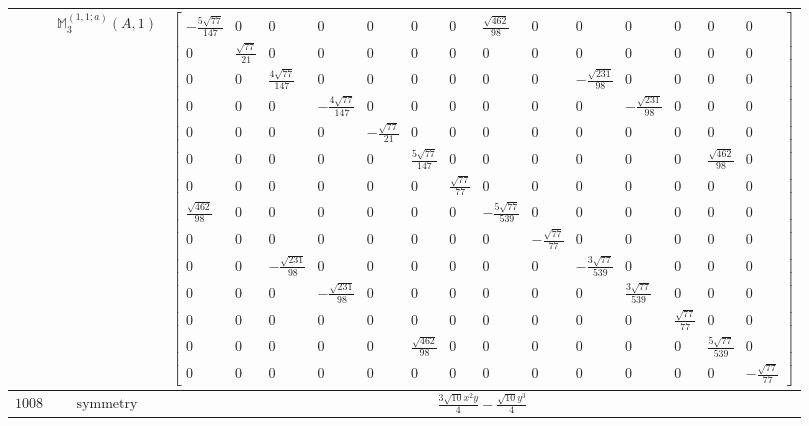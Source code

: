 \documentclass[fleqn,8pt,landscape]{jsarticle}
\begin{document}
\begin{longtable}{ccc}
$  $ & $ \mathbb{M}_{3}^{(1,1;a)}(A,1) $ & $ \begin{bmatrix} - \frac{5 \sqrt{77}}{147} & 0 & 0 & 0 & 0 & 0 & 0 & \frac{\sqrt{462}}{98} & 0 & 0 & 0 & 0 & 0 & 0 \\ 0 & \frac{\sqrt{77}}{21} & 0 & 0 & 0 & 0 & 0 & 0 & 0 & 0 & 0 & 0 & 0 & 0 \\ 0 & 0 & \frac{4 \sqrt{77}}{147} & 0 & 0 & 0 & 0 & 0 & 0 & - \frac{\sqrt{231}}{98} & 0 & 0 & 0 & 0 \\ 0 & 0 & 0 & - \frac{4 \sqrt{77}}{147} & 0 & 0 & 0 & 0 & 0 & 0 & - \frac{\sqrt{231}}{98} & 0 & 0 & 0 \\ 0 & 0 & 0 & 0 & - \frac{\sqrt{77}}{21} & 0 & 0 & 0 & 0 & 0 & 0 & 0 & 0 & 0 \\ 0 & 0 & 0 & 0 & 0 & \frac{5 \sqrt{77}}{147} & 0 & 0 & 0 & 0 & 0 & 0 & \frac{\sqrt{462}}{98} & 0 \\ 0 & 0 & 0 & 0 & 0 & 0 & \frac{\sqrt{77}}{77} & 0 & 0 & 0 & 0 & 0 & 0 & 0 \\ \frac{\sqrt{462}}{98} & 0 & 0 & 0 & 0 & 0 & 0 & - \frac{5 \sqrt{77}}{539} & 0 & 0 & 0 & 0 & 0 & 0 \\ 0 & 0 & 0 & 0 & 0 & 0 & 0 & 0 & - \frac{\sqrt{77}}{77} & 0 & 0 & 0 & 0 & 0 \\ 0 & 0 & - \frac{\sqrt{231}}{98} & 0 & 0 & 0 & 0 & 0 & 0 & - \frac{3 \sqrt{77}}{539} & 0 & 0 & 0 & 0 \\ 0 & 0 & 0 & - \frac{\sqrt{231}}{98} & 0 & 0 & 0 & 0 & 0 & 0 & \frac{3 \sqrt{77}}{539} & 0 & 0 & 0 \\ 0 & 0 & 0 & 0 & 0 & 0 & 0 & 0 & 0 & 0 & 0 & \frac{\sqrt{77}}{77} & 0 & 0 \\ 0 & 0 & 0 & 0 & 0 & \frac{\sqrt{462}}{98} & 0 & 0 & 0 & 0 & 0 & 0 & \frac{5 \sqrt{77}}{539} & 0 \\ 0 & 0 & 0 & 0 & 0 & 0 & 0 & 0 & 0 & 0 & 0 & 0 & 0 & - \frac{\sqrt{77}}{77} \end{bmatrix} $ \\ \hline
$ 1008 $ & $ \text{symmetry} $ & $ \frac{3 \sqrt{10} x^{2} y}{4} - \frac{\sqrt{10} y^{3}}{4} $ \\

\end{longtable}
\end{document}
